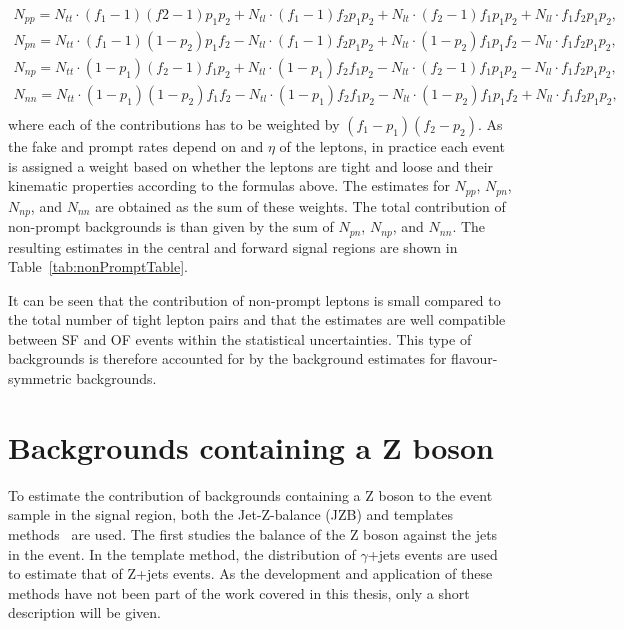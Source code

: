 \begin{eqnarray*}
N_{pp} = N_{tt}\cdot(f_1 -1)(f2-1)p_1p_2 + N_{tl}\cdot(f_1 -1)f_2p_1p_2 + N_{lt}\cdot (f_2-1)f_1p_1p_2 + N_{ll}\cdot f_1f_2p_1p_2,\\
N_{pn} = N_{tt}\cdot(f_1 -1)(1-p_2)p_1f_2 - N_{tl}\cdot(f_1 -1)f_2p_1p_2 + N_{lt}\cdot (1-p_2)f_1p_1f_2 - N_{ll}\cdot f_1f_2p_1p_2,\\
N_{np} = N_{tt}\cdot(1 - p_1)(f_2 - 1)f_1p_2 + N_{tl}\cdot(1-p_1)f_2f_1p_2 - N_{lt}\cdot (f_2-1)f_1p_1p_2 - N_{ll}\cdot f_1f_2p_1p_2,\\
N_{nn} = N_{tt}\cdot(1-p_1)(1-p_2)f_1f_2 - N_{tl}\cdot (1-p_1)f_2f_1p_2 - N_{lt}\cdot (1-p_2)f_1p_1f_2 + N_{ll}\cdot f_1f_2p_1p_2,\\
\end{eqnarray*}
where each of the contributions has to be weighted by $(f_1-p_1)(f_2-p_2)$. As the fake and prompt rates depend on \pt and $\eta$ of the leptons, in practice each event is assigned a weight based on whether the leptons are tight and loose and their kinematic properties according to the formulas above. The estimates for $N_{pp}$, $N_{pn}$, $N_{np}$, and $N_{nn}$ are obtained as the sum of these weights. The total contribution of non-prompt backgrounds is than given by the sum of $N_{pn}$, $N_{np}$, and $N_{nn}$. The resulting estimates in the central and forward signal regions are shown in Table~\ref{tab:nonPromptTable}. 

It can be seen that the contribution of non-prompt leptons is small compared to the total number of tight lepton pairs and that the estimates are well compatible between SF and OF events within the statistical uncertainties. This type of backgrounds is therefore accounted for by the background estimates for flavour-symmetric backgrounds.
\section{Backgrounds containing a Z boson}
To estimate the contribution of backgrounds containing a Z boson to the event sample in the signal region, both the Jet-Z-balance (JZB) and \MET templates methods~\cite{Chatrchyan:2012qka} are used. The first studies the balance of the Z boson against the jets in the event. In the \MET template method, the \MET distribution of $\gamma$+jets events are used to estimate that of Z+jets events. As the development and application of these methods have not been part of the work covered in this thesis, only a short description will be given.
